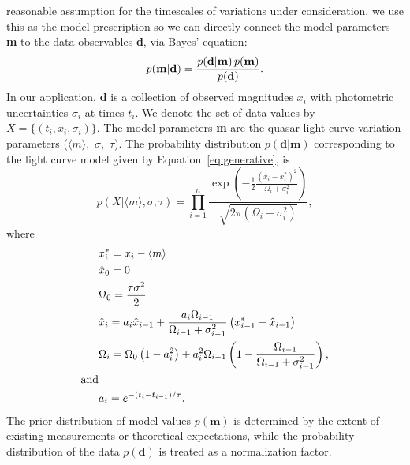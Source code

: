 \documentclass{emulateapj}
\begin{document}
reasonable assumption for the timescales of variations under
consideration, we use this as the model prescription so we can
directly connect the model parameters {\bf m} to the data observables
{\bf d}, via Bayes' equation:
\begin{equation}
p({\mathbf m} | {\mathbf d}) = 
{{p({\mathbf d} | {\mathbf m})\, p({\mathbf m})}
\over{p({\mathbf  d})}}. \nonumber 
\end{equation}
In our application, {\bf d} is a collection of observed magnitudes
${x_{i}}$ with photometric uncertainties $\sigma_i$ at times
${t_i}$. We denote the set of data values by
$X=\{(t_i,x_i,\sigma_i)\}$. The model parameters {\bf m} are the
quasar light curve variation parameters ($\langle
m\rangle$,~$\sigma$,~$\tau$). The probability distribution $p({\mathbf
  d} | {\mathbf m})$ corresponding to the light curve model given by
Equation~\ref{eq:generative},
is 
\begin{equation} 
p(X|\langle m\rangle, \sigma,\tau) =
\prod_{i=1}^{n}
\frac{
\exp\left(-\frac{1}{2}%
\frac{\left(\hat{x}_i-x^{*}_i\right)^2}{\Omega_i+\sigma_i^2}\right)
}
{
\sqrt{2\pi\left(\Omega_i+\sigma_i^2\right)}
}, 
\end{equation}
where 
\begin{alignat}{1}
& x_{i}^{*} = x_i-\langle m \rangle \nonumber\\
& \hat{x}_0 = 0   \nonumber\\
& \Omega_{0}=\frac{\tau\sigma^2}{2} \nonumber\\
& \hat{x}_i = a_i\hat{x}_{i-1} + \frac{a_i\Omega_{i-1}}{\Omega_{i-1}+\sigma^2_{i-1}} \left(x^{*}_{i-1}-\hat{x}_{i-1}\right) \nonumber\\
& \Omega_{i}=\Omega_{0}\left(1-a_{i}^2\right) +
a_{i}^2\Omega_{i-1}\left(1-\frac{\Omega_{i-1}}{\Omega_{i-1}+\sigma_{i-1}^2}\right),\\
{\rm and} \nonumber\\
& a_i = e^{-\left(t_i-t_{i-1}\right)/\tau}. \nonumber
\end{alignat}
The prior distribution of model values $p(\mathbf{m})$ is determined
by the extent of existing measurements or theoretical expectations,
while the probability distribution of the data $p(\mathbf{d})$ is
treated as a normalization factor.
\end{document}
